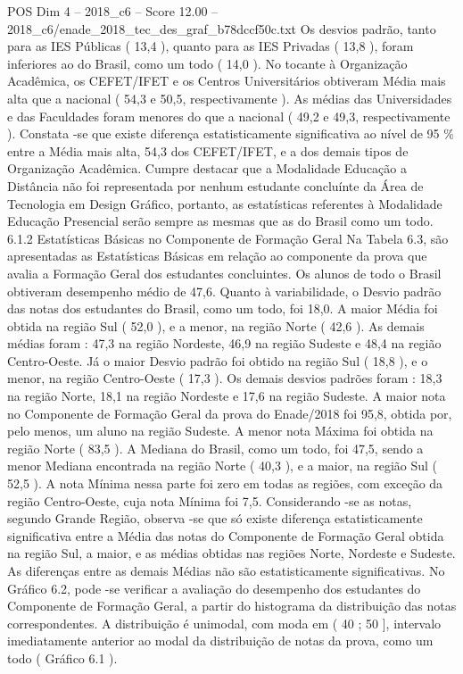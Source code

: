 \begin{textsample}{POS Dim 4 – 2018\_c6 – Score 12.00 – 2018\_c6/enade\_2018\_tec\_des\_graf\_b78dccf50c.txt}
Os desvios padrão, tanto para as IES Públicas ( 13,4 ), quanto para as IES Privadas ( 13,8 ), foram inferiores ao do Brasil, como um todo ( 14,0 ).
No tocante à Organização Acadêmica, os CEFET/IFET e os Centros Universitários obtiveram Média mais alta que a nacional ( 54,3 e 50,5, respectivamente ).
As médias das Universidades e das Faculdades foram menores do que a nacional ( 49,2 e 49,3, respectivamente ).
Constata -se que existe diferença estatisticamente significativa ao nível de 95 \% entre a Média mais alta, 54,3 dos CEFET/IFET, e a dos demais tipos de Organização Acadêmica.
Cumpre destacar que a Modalidade Educação a Distância não foi representada por nenhum estudante concluínte da Área de Tecnologia em Design Gráfico, portanto, as estatísticas referentes à Modalidade Educação Presencial serão sempre as mesmas que as do Brasil como um todo. 6.1.2 Estatísticas Básicas no Componente de Formação Geral Na Tabela 6.3, são apresentadas as Estatísticas Básicas em relação ao componente da prova que avalia a Formação Geral dos estudantes concluintes.
Os alunos de todo o Brasil obtiveram desempenho médio de 47,6.
Quanto à variabilidade, o Desvio padrão das notas dos estudantes do Brasil, como um todo, foi 18,0.
A maior Média foi obtida na região Sul ( 52,0 ), e a menor, na região Norte ( 42,6 ).
As demais médias foram : 47,3 na região Nordeste, 46,9 na região Sudeste e 48,4 na região Centro-Oeste.
Já o maior Desvio padrão foi obtido na região Sul ( 18,8 ), e o menor, na região Centro-Oeste ( 17,3 ).
Os demais desvios padrões foram : 18,3 na região Norte, 18,1 na região Nordeste e 17,6 na região Sudeste.
A maior nota no Componente de Formação Geral da prova do Enade/2018 foi 95,8, obtida por, pelo menos, um aluno na região Sudeste.
A menor nota Máxima foi obtida na região Norte ( 83,5 ).
A Mediana do Brasil, como um todo, foi 47,5, sendo a menor Mediana encontrada na região Norte ( 40,3 ), e a maior, na região Sul ( 52,5 ).
A nota Mínima nessa parte foi zero em todas as regiões, com exceção da região Centro-Oeste, cuja nota Mínima foi 7,5.
Considerando -se as notas, segundo Grande Região, observa -se que só existe diferença estatisticamente significativa entre a Média das notas do Componente de Formação Geral obtida na região Sul, a maior, e as médias obtidas nas regiões Norte, Nordeste e Sudeste.
As diferenças entre as demais Médias não são estatisticamente significativas.
No Gráfico 6.2, pode -se verificar a avaliação do desempenho dos estudantes do Componente de Formação Geral, a partir do histograma da distribuição das notas correspondentes.
A distribuição é unimodal, com moda em ( 40 ; 50 ], intervalo imediatamente anterior ao modal da distribuição de notas da prova, como um todo ( Gráfico 6.1 ).

\end{textsample}
